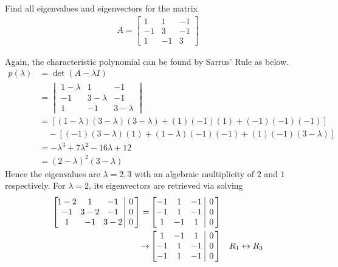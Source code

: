 \begin{exmp}
\label{exmp:2geomul}
Find all eigenvalues and eigenvectors for the matrix
\begin{align*}
A = \begin{bmatrix}
1 & 1 & -1 \\
-1 & 3 & -1 \\
1 & -1 & 3
\end{bmatrix}
\end{align*}
\end{exmp}
\begin{solution}
Again, the characteristic polynomial can be found by Sarrus' Rule as below.
\begin{align*}
p(\lambda) &= \det(A-\lambda I) \\
&= \begin{vmatrix}
1-\lambda & 1 & -1 \\
-1 & 3-\lambda & -1 \\
1 & -1 & 3-\lambda
\end{vmatrix} \\
&= [(1-\lambda)(3-\lambda)(3-\lambda) + (1)(-1)(1) + (-1)(-1)(-1)] \\
&\quad - [(-1)(3-\lambda)(1) + (1-\lambda)(-1)(-1) + (1)(-1)(3-\lambda)]\\
&= -\lambda^3 + 7\lambda^2 - 16\lambda + 12 \\
&= (2-\lambda)^2(3-\lambda)
\end{align*}
Hence the eigenvalues are $\lambda = 2,3$ with an algebraic multiplicity of $2$ and $1$ respectively. For $\lambda = 2$, its eigenvectors are retrieved via solving
\begin{align*}
\left[\begin{array}{@{\,}wc{17pt}wc{17pt}wc{17pt}|c@{\,}}
1-2 & 1 & -1 & 0 \\
-1 & 3-2 & -1 & 0 \\
1 & -1 & 3-2 & 0
\end{array}\right]
=& 
\left[\begin{array}{@{\,}wc{10pt}wc{10pt}wc{10pt}|c@{\,}}
-1 & 1 & -1 & 0 \\
-1 & 1 & -1 & 0 \\
1 & -1 & 1 & 0
\end{array}\right] \\ 
\to&
\left[\begin{array}{@{\,}wc{10pt}wc{10pt}wc{10pt}|c@{\,}}
1 & -1 & 1 & 0 \\
-1 & 1 & -1 & 0 \\
-1 & 1 & -1 & 0 
\end{array}\right] & R_1 \leftrightarrow R_3 \\

\end{align*}
\end{solution}
